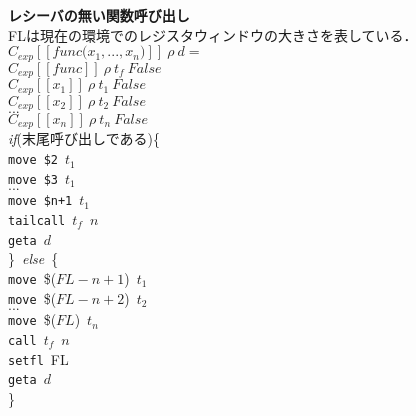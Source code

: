 \documentclass[a4j,12pt]{jarticle}
\begin{document}
{\begin{tabbing}
\textbf{レシーバの無い関数呼び出し} \\
FLは現在の環境でのレジスタウィンドウの大きさを表している． \\
\>$C_{exp}[[func\texttt{(}x_1, ... , x_n\texttt{)}]]\ \rho\ d=$ \\
\>\>$C_{exp}[[func]]\ \rho\ t_f\ False$ \\
\>\>$C_{exp}[[x_1]]\ \rho\ t_1\ False$ \\
\>\>$C_{exp}[[x_2]]\ \rho\ t_2\ False$ \\
\>\>$...$ \\
\>\>$C_{exp}[[x_n]]\ \rho\ t_n\ False$ \\
\>\>\textit{if}(末尾呼び出しである)\{ \\
\>\>\>\texttt{move}\ \texttt{\$2}\ $t_1$ \\
\>\>\>\texttt{move}\ \texttt{\$3}\ $t_1$ \\
\>\>\>$...$ \\
\>\>\>\texttt{move}\ \texttt{\$n+1}\ $t_1$ \\
\>\>\>\texttt{tailcall}\ $t_f$\ $n$ \\
\>\>\>\texttt{geta}\ $d$ \\
\>\>\}\ \textit{else}\ \{ \\
\>\>\>\texttt{move}\ \$($FL-n+1$)\ $t_1$ \\
\>\>\>\texttt{move}\ \$($FL-n+2$)\ $t_2$ \\
\>\>\>$...$ \\
\>\>\>\texttt{move}\ \$($FL$)\ $t_n$ \\
\>\>\>\texttt{call}\ $t_f$\ $n$ \\
\>\>\>\texttt{setfl}\ FL \\
\>\>\>\texttt{geta}\ $d$ \\
\>\>\} \\
\\


\end{tabbing}}
\end{document}
